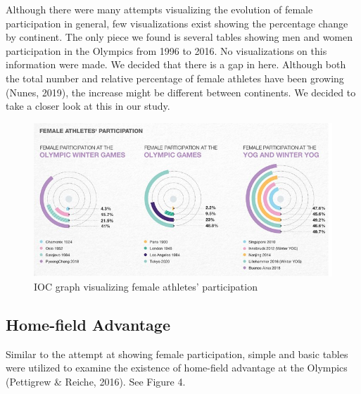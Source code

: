 \documentclass[12pt]{article}
\begin{document}
Although there were many attempts visualizing the evolution of female participation in general, few visualizations exist showing the percentage change by continent. The only piece we found is several tables showing men and women participation in the Olympics from 1996 to 2016. No visualizations on this information were made. We decided that there is a gap in here. Although both the total number and relative percentage of female athletes have been growing (Nunes, 2019), the increase might be different between continents. We decided to take a closer look at this in our study. 
\begin{figure}[!b]
    \centering
    \includegraphics[scale=0.4]{pics/1-5.png}
    \caption{IOC graph visualizing female athletes' participation}
    \label{fig:my_label}
\end{figure}
\FloatBarrier %

\subsection{Home-field Advantage}
Similar to the attempt at showing female participation, simple and basic tables were utilized to examine the existence of home-field advantage at the Olympics (Pettigrew \& Reiche, 2016). See Figure 4.
\end{document}
